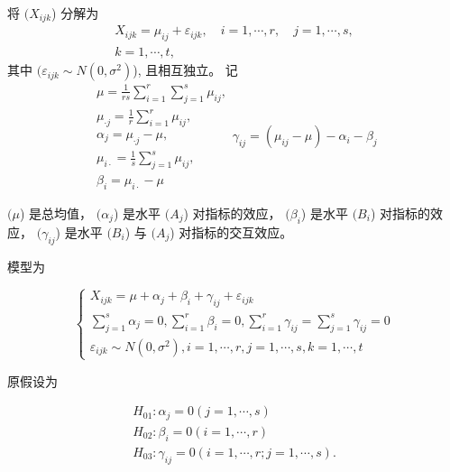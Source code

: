 将 $( {X}_{i j k} $) 分解为
\begin{equation}
\begin{array}{c}
X_{i j k}=\mu_{i j}+\varepsilon_{i j k}, \quad i=1, \cdots, r, \quad j=1, \cdots, s, \\
k=1, \cdots, t,
\end{array}
\end{equation}
其中 $( \varepsilon_{i j k} \sim N\left(0, \sigma^{2}\right) $), 且相互独立。  记
\begin{equation}
\begin{array}{l}
\mu=\frac{1}{r s} \sum_{i=1}^{r} \sum_{j=1}^{s} \mu_{i j}, \\ \mu_{\cdot j}=\frac{1}{r} \sum_{i=1}^{r} \mu_{i j}, \\
 \alpha_{j}=\mu_{\cdot j}-\mu, \\
\mu_{i \cdot}=\frac{1}{s} \sum_{j=1}^{s} \mu_{i j} ,\\ 
 \beta_{i}=\mu_{i \cdot}-\mu
\end{array}
\gamma_{i j}=\left(\mu_{i j}-\mu\right)-\alpha_{i}-\beta_{j}
\end{equation}

$( \mu $) 是总均值， $( \alpha_{j} $) 是水平 $( A_{j} $) 对指标的效应， $( \beta_{i} $) 是水平 $( {B}_{i} $)
对指标的效应， $( \gamma_{i j} $) 是水平 $( B_{i} $) 与 $( A_{j} $) 对指标的交互效应。 

模型为

\begin{equation} \left\{\begin{array}{l}{X}_{i j k}=\mu+{\alpha}_{j}+\beta_{i}+\gamma_{i j}+\varepsilon_{i j k} \\ \sum_{j=1}^{s} \alpha_{j}=0, \sum_{i=1}^{r} \beta_{i}=0, \sum_{i=1}^{r} \gamma_{i j}=\sum_{j=1}^{s} \gamma_{i j}=0 \\ \varepsilon_{i j k} \sim N\left(0, \sigma^{2}\right), i=1, \cdots, r, j=1, \cdots, s, k=1, \cdots, t\end{array}\right. \end{equation}

原假设为

\begin{equation}
\begin{array}{l}
H_{01}: \alpha_{j}=0(j=1, \cdots, s) \\
H_{02}: \beta_{i}=0(i=1, \cdots, r) \\
H_{03}: \gamma_{i j}=0(i=1, \cdots, r ; j=1, \cdots, s) .
\end{array}
\end{equation}

